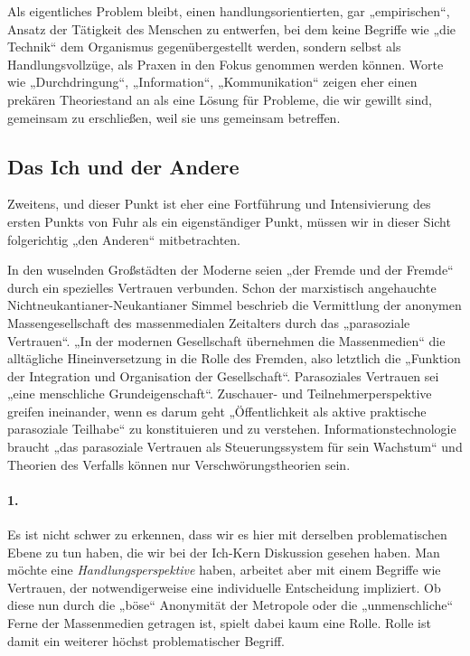 \documentclass[12pt,a4paper]{article}
\begin{document}
Als eigentliches Problem bleibt, einen handlungsorientierten, gar
„empirischen“, Ansatz der Tätigkeit des Menschen zu entwerfen, bei dem keine
Begriffe wie „die Technik“ dem Organismus gegenübergestellt werden, sondern
selbst als Handlungsvollzüge, als Praxen in den Fokus genommen werden
können. Worte wie „Durchdringung“, „Information“, „Kommunikation“ zeigen eher
einen prekären Theoriestand an als eine Lösung für Probleme, die wir gewillt
sind, gemeinsam zu erschließen, weil sie uns gemeinsam betreffen.

\subsection*{Das Ich und der Andere}

Zweitens, und dieser Punkt ist eher eine Fortführung und Intensivierung des
ersten Punkts von Fuhr als ein eigenständiger Punkt, müssen wir in dieser Sicht
folgerichtig „den Anderen“ mitbetrachten.

In den wuselnden Großstädten der Moderne seien „der Fremde und der Fremde“
durch ein spezielles Vertrauen verbunden. Schon der marxistisch angehauchte
Nichtneukantianer-Neukantianer Simmel beschrieb die Vermittlung der anonymen
Massengesellschaft des massenmedialen Zeitalters durch das „parasoziale
Vertrauen“. „In der modernen Gesellschaft übernehmen die Massenmedien“ die
alltägliche Hineinversetzung in die Rolle des Fremden, also letztlich die
„Funktion der Integration und Organisation der Gesellschaft“. Parasoziales
Vertrauen sei „eine menschliche Grundeigenschaft“. Zuschauer- und
Teilnehmerperspektive greifen ineinander, wenn es darum geht „Öffentlichkeit
als aktive praktische parasoziale Teilhabe“ zu konstituieren und zu
verstehen. Informationstechnologie braucht „das parasoziale Vertrauen als
Steuerungssystem für sein Wachstum“ und Theorien des Verfalls können nur
Verschwörungstheorien sein.

\paragraph{1.} 
Es ist nicht schwer zu erkennen, dass wir es hier mit derselben problematischen
Ebene zu tun haben, die wir bei der Ich-Kern Diskussion gesehen haben. Man
möchte eine \emph{Handlungsperspektive} haben, arbeitet aber mit einem Begriffe
wie Vertrauen, der notwendigerweise eine individuelle Entscheidung impliziert.
Ob diese nun durch die „böse“ Anonymität der Metropole oder die „unmenschliche“
Ferne der Massenmedien getragen ist, spielt dabei kaum eine Rolle. Rolle ist
damit ein weiterer höchst problematischer Begriff.
\end{document}
